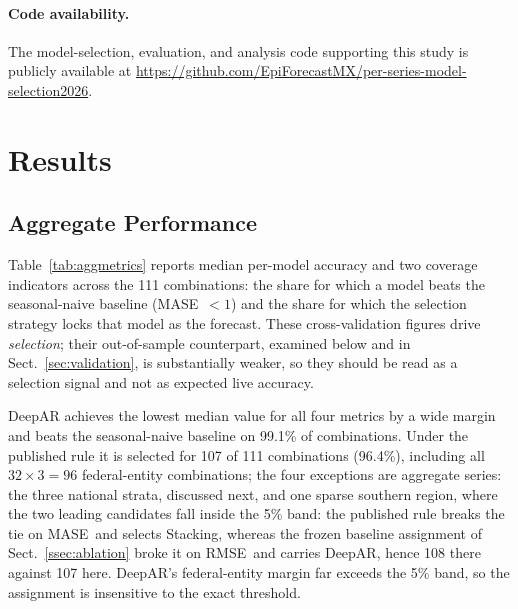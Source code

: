 \documentclass[runningheads]{llncs}
\newcommand{\mase}{MASE}
\newcommand{\rmse}{RMSE}
\begin{document}
\paragraph{Code availability.}
The model-selection, evaluation, and analysis code supporting this
study is publicly available at
\url{https://github.com/EpiForecastMX/per-series-model-selection2026}.

\section{Results}
\label{sec:results}

\subsection{Aggregate Performance}

Table~\ref{tab:aggmetrics} reports median per-model accuracy and two
coverage indicators across the 111 combinations: the share for which a
model beats the seasonal-naive baseline (\mase\ $<1$) and the share for
which the selection strategy locks that model as the forecast. These
cross-validation figures drive \emph{selection}; their out-of-sample
counterpart, examined below and in Sect.~\ref{sec:validation}, is
substantially weaker, so they should be read as a selection signal and
not as expected live accuracy.

DeepAR achieves the lowest median value for all four metrics by a wide
margin and beats the seasonal-naive baseline on 99.1\% of
combinations. Under the published rule it is selected for 107 of 111
combinations (96.4\%), including all $32\times3=96$
federal-entity combinations; the four exceptions are aggregate series:
the three national strata, discussed next, and one sparse southern
region, where the two leading candidates fall inside the 5\% band: the
published rule breaks the tie on \mase\ and selects Stacking, whereas
the frozen baseline assignment of Sect.~\ref{ssec:ablation} broke it on
\rmse\ and carries DeepAR, hence 108 there against 107 here. DeepAR's federal-entity margin far exceeds the 5\%
band, so the assignment is insensitive to the exact threshold.
\end{document}
